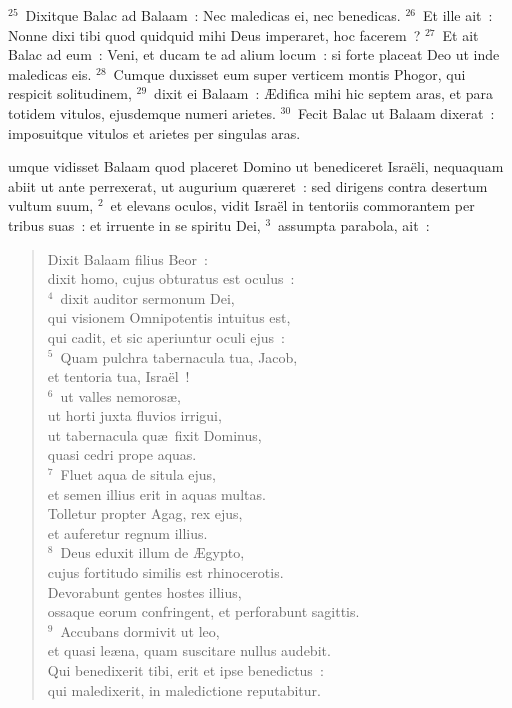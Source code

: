 ${}^{25}$~Dixitque Balac ad Balaam~: Nec maledicas ei, nec benedicas.
${}^{26}$~Et ille ait~: Nonne dixi tibi quod quidquid mihi Deus imperaret, hoc facerem~?
${}^{27}$~Et ait Balac ad eum~: Veni, et ducam te ad alium locum~: si forte placeat Deo ut inde maledicas eis.
${}^{28}$~Cumque duxisset eum super verticem montis Phogor, qui respicit solitudinem,
${}^{29}$~dixit ei Balaam~: \AE difica mihi hic septem aras, et para totidem vitulos, ejusdemque numeri arietes.
${}^{30}$~Fecit Balac ut Balaam dixerat~: imposuitque vitulos et arietes per singulas aras.

\bchapter
{}umque vidisset Balaam quod placeret Domino ut benediceret Isra\"eli, nequaquam abiit ut ante perrexerat, ut augurium qu\ae reret~: sed dirigens contra desertum vultum suum,
${}^{2}$~et elevans oculos, vidit Isra\"el in tentoriis commorantem per tribus suas~: et irruente in se spiritu Dei,
${}^{3}$~assumpta parabola, ait~: \begin{flushleft}\begin{verse}Dixit Balaam filius Beor~:\\ dixit homo, cujus obturatus est oculus~:\\
${}^{4}$~dixit auditor sermonum Dei,\\ qui visionem Omnipotentis intuitus est,\\ qui cadit, et sic aperiuntur oculi ejus~:\\
${}^{5}$~Quam pulchra tabernacula tua, Jacob,\\ et tentoria tua, Isra\"el~!\\
${}^{6}$~ut valles nemoros\ae ,\\ ut horti juxta fluvios irrigui,\\ ut tabernacula qu\ae\ fixit Dominus,\\ quasi cedri prope aquas.\\
${}^{7}$~Fluet aqua de situla ejus,\\ et semen illius erit in aquas multas.\\ Tolletur propter Agag, rex ejus,\\ et auferetur regnum illius.\\
${}^{8}$~Deus eduxit illum de \AE gypto,\\ cujus fortitudo similis est rhinocerotis.\\ Devorabunt gentes hostes illius,\\ ossaque eorum confringent, et perforabunt sagittis.\\
${}^{9}$~Accubans dormivit ut leo,\\ et quasi le\ae na, quam suscitare nullus audebit.\\ Qui benedixerit tibi, erit et ipse benedictus~:\\ qui maledixerit, in maledictione reputabitur.\end{verse}\end{flushleft}


